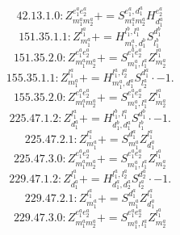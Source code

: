 \documentclass[letterpaper,10pt,fleqn,leqno,onecolumn]{article}
\begin{document}
\begin{equation} \;\;\;\;\;\;  42.13.1.0: Z^{e_{1}^{a}e_{2}^{a}}_{m_{1}^{a}m_{2}^{a}}+=S^{e_{1}^{a},d_{1}^{a}}_{m_{1}^{a}m_{2}^{a}}H^{e_{2}^{a}}_{d_{1}^{a}} \end{equation}
\begin{equation} \;\;\;\;\;\;  151.35.1.1: Z^{l_{1}^{a}}_{m_{1}^{a}}+=H^{l_{1}^{b},l_{1}^{a}}_{m_{1}^{a},d_{1}^{b}}S^{d_{1}^{b}}_{l_{1}^{b}} \end{equation}
\begin{equation} \;\;\;\;\;\;  151.35.2.0: Z^{e_{1}^{a}e_{2}^{a}}_{m_{1}^{a}m_{2}^{a}}+=S^{e_{1}^{a}e_{2}^{a}}_{m_{1}^{a},l_{1}^{a}}Z^{l_{1}^{a}}_{m_{2}^{a}} \end{equation}
\begin{equation} \;\;\;\;\;\;  155.35.1.1: Z^{l_{1}^{a}}_{m_{1}^{a}}+=H^{l_{1}^{a},l_{2}^{a}}_{m_{1}^{a},d_{1}^{a}}S^{d_{1}^{a}}_{l_{2}^{a}}\cdot -1. \end{equation}
\begin{equation} \;\;\;\;\;\;  155.35.2.0: Z^{e_{1}^{a}e_{2}^{a}}_{m_{1}^{a}m_{2}^{a}}+=S^{e_{1}^{a}e_{2}^{a}}_{m_{1}^{a},l_{1}^{a}}Z^{l_{1}^{a}}_{m_{2}^{a}} \end{equation}
\begin{equation} \;\;\;\;\;\;  225.47.1.2: Z^{l_{1}^{a}}_{d_{1}^{a}}+=H^{l_{1}^{b},l_{1}^{a}}_{d_{1}^{b},d_{1}^{a}}S^{d_{1}^{b}}_{l_{1}^{b}}\cdot -1. \end{equation}
\begin{equation} \;\;\;\;\;\;  225.47.2.1: Z^{l_{1}^{a}}_{m_{1}^{a}}+=S^{d_{1}^{a}}_{m_{1}^{a}}Z^{l_{1}^{a}}_{d_{1}^{a}} \end{equation}
\begin{equation} \;\;\;\;\;\;  225.47.3.0: Z^{e_{1}^{a}e_{2}^{a}}_{m_{1}^{a}m_{2}^{a}}+=S^{e_{1}^{a}e_{2}^{a}}_{m_{1}^{a},l_{1}^{a}}Z^{l_{1}^{a}}_{m_{2}^{a}} \end{equation}
\begin{equation} \;\;\;\;\;\;  229.47.1.2: Z^{l_{1}^{a}}_{d_{1}^{a}}+=H^{l_{1}^{a},l_{2}^{a}}_{d_{1}^{a},d_{2}^{a}}S^{d_{2}^{a}}_{l_{2}^{a}}\cdot -1. \end{equation}
\begin{equation} \;\;\;\;\;\;  229.47.2.1: Z^{l_{1}^{a}}_{m_{1}^{a}}+=S^{d_{1}^{a}}_{m_{1}^{a}}Z^{l_{1}^{a}}_{d_{1}^{a}} \end{equation}
\begin{equation} \;\;\;\;\;\;  229.47.3.0: Z^{e_{1}^{a}e_{2}^{a}}_{m_{1}^{a}m_{2}^{a}}+=S^{e_{1}^{a}e_{2}^{a}}_{m_{1}^{a},l_{1}^{a}}Z^{l_{1}^{a}}_{m_{2}^{a}} \end{equation}
\end{document}
